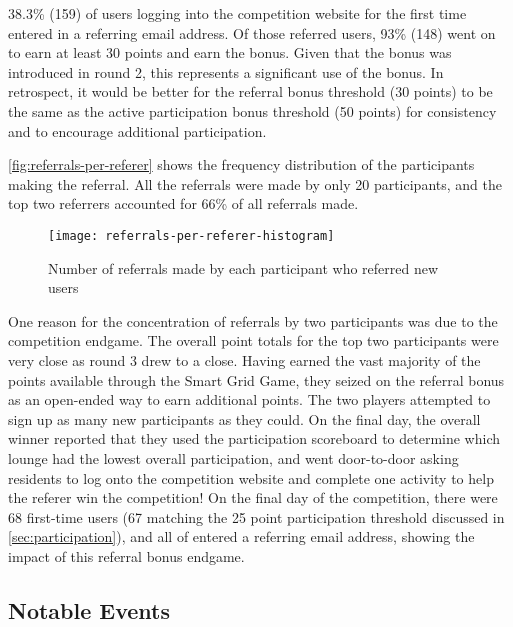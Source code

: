 38.3\% (159) of users logging into the competition website for the first time entered in a referring email address. Of those referred users, 93\% (148) went on to earn at least 30 points and earn the bonus. Given that the bonus was introduced in round 2, this represents a significant use of the bonus. In retrospect, it would be better for the referral bonus threshold (30 points) to be the same as the active participation bonus threshold (50 points) for consistency and to encourage additional participation.

\autoref{fig:referrals-per-referer} shows the frequency distribution of the participants making the referral. All the referrals were made by only 20 participants, and the top two referrers accounted for 66\% of all referrals made.

\begin{figure}[htbp]
	\centering
		\texttt{[image: referrals-per-referer-histogram]}
		\caption{Number of referrals made by each participant who referred new users}
\label{fig:referrals-per-referer}
\end{figure}

One reason for the concentration of referrals by two participants was due to the competition endgame. The overall point totals for the top two participants were very close as round 3 drew to a close. Having earned the vast majority of the points available through the Smart Grid Game, they seized on the referral bonus as an open-ended way to earn additional points. The two players attempted to sign up as many new participants as they could. On the final day, the overall winner reported that they used the participation scoreboard to determine which lounge had the lowest overall participation, and went door-to-door asking residents to log onto the competition website and complete one activity to help the referer win the competition! On the final day of the competition, there were 68 first-time users (67 matching the 25 point participation threshold discussed in \autoref{sec:participation}), and all of entered a referring email address, showing the impact of this referral bonus endgame.

\subsection{Notable Events}




